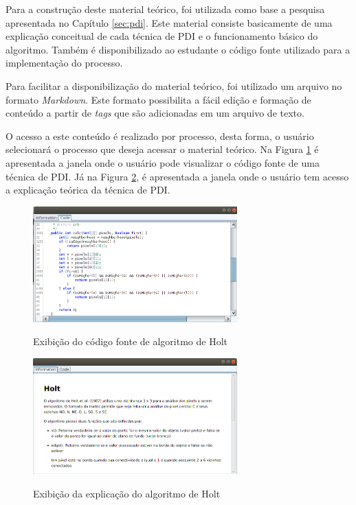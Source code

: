 \documentclass[
	12pt,				%
	oneside,			%
	a4paper,			%
	english,			%
	french,				%
	spanish,			%
	brazil,				%
	]{abntex2}
\begin{document}
Para a construção deste material teórico, foi utilizada como base a pesquisa apresentada no Capítulo \ref{sec:pdi}. Este material consiste basicamente de uma explicação conceitual de cada técnica de PDI e o funcionamento básico do algoritmo. Também é disponibilizado ao estudante o código fonte utilizado para a implementação do processo.

Para facilitar a disponibilização do material teórico, foi utilizado um arquivo no formato \textit{Markdown}. Este formato possibilita a fácil edição e formação de conteúdo a partir de \textit{tags} que são adicionadas em um arquivo de texto.

O acesso a este conteúdo é realizado por processo, desta forma, o usuário selecionará o processo que deseja acessar o material teórico. Na Figura \ref{fig:visnodeCode} é apresentada a janela onde o usuário pode visualizar o código fonte de uma técnica de PDI. Já na Figura \ref{fig:visnodeInformation}, é apresentada a janela onde o usuário tem acesso a explicação teórica da técnica de PDI.

\begin{figure}[ht]
\centering
\caption{Exibição do código fonte de algoritmo de Holt}
\includegraphics[width=0.7\textwidth]{imagens/visnode_code.png}
\sourceAuthor
\label{fig:visnodeCode}
\end{figure}

\begin{figure}[ht]
\centering
\caption{Exibição da explicação do algoritmo de Holt}
\includegraphics[width=0.7\textwidth]{imagens/visnode_information.png}
\sourceAuthor
\label{fig:visnodeInformation}
\end{figure}
\end{document}
